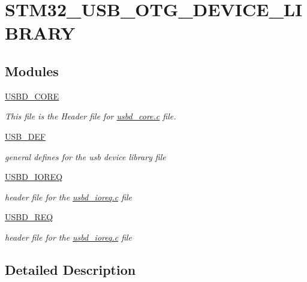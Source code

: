 \hypertarget{group___s_t_m32___u_s_b___o_t_g___d_e_v_i_c_e___l_i_b_r_a_r_y}{\section{S\-T\-M32\-\_\-\-U\-S\-B\-\_\-\-O\-T\-G\-\_\-\-D\-E\-V\-I\-C\-E\-\_\-\-L\-I\-B\-R\-A\-R\-Y}
\label{group___s_t_m32___u_s_b___o_t_g___d_e_v_i_c_e___l_i_b_r_a_r_y}
}
\subsection*{Modules}
\begin{DoxyCompactItemize}
\item 
\hyperlink{group___u_s_b_d___c_o_r_e}{U\-S\-B\-D\-\_\-\-C\-O\-R\-E}
\begin{DoxyCompactList}\small\item\em This file is the Header file for \hyperlink{usbd__core_8c}{usbd\-\_\-core.\-c} file. \end{DoxyCompactList}\item 
\hyperlink{group___u_s_b___d_e_f}{U\-S\-B\-\_\-\-D\-E\-F}
\begin{DoxyCompactList}\small\item\em general defines for the usb device library file \end{DoxyCompactList}\item 
\hyperlink{group___u_s_b_d___i_o_r_e_q}{U\-S\-B\-D\-\_\-\-I\-O\-R\-E\-Q}
\begin{DoxyCompactList}\small\item\em header file for the \hyperlink{usbd__ioreq_8c}{usbd\-\_\-ioreq.\-c} file \end{DoxyCompactList}\item 
\hyperlink{group___u_s_b_d___r_e_q}{U\-S\-B\-D\-\_\-\-R\-E\-Q}
\begin{DoxyCompactList}\small\item\em header file for the \hyperlink{usbd__ioreq_8c}{usbd\-\_\-ioreq.\-c} file \end{DoxyCompactList}\end{DoxyCompactItemize}


\subsection{Detailed Description}
